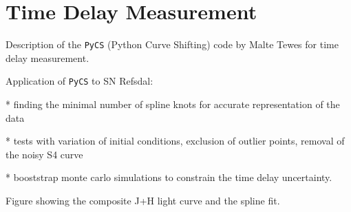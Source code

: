\section{Time Delay Measurement}\label{sec:TimeDelayMeasurement}

Description of the {\tt PyCS} (Python Curve Shifting) code by Malte Tewes for time delay measurement. 

Application of {\tt PyCS} to SN Refsdal: 

 * finding the minimal number of spline knots for accurate representation of the data

 * tests with variation of initial conditions, exclusion of outlier points, removal of the noisy S4 curve

 * booststrap monte carlo simulations to constrain the time delay uncertainty.
 
Figure showing the composite J+H light curve and the spline fit. 



